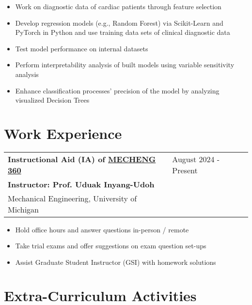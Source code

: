 \documentclass[letter,12pt]{article}
\begin{document}
\begin{itemize}[
    rightmargin=2cm
]
    \setlength{\itemsep}{1pt}
    \setlength{\parskip}{0pt}
    \setlength{\parsep}{0pt}
    \item{\small Work on diagnostic data of cardiac patients through feature selection}
    \item{\small Develop regression models (e.g., Random Forest) via Scikit-Learn and PyTorch in Python and use training data sets of clinical diagnostic data}
    \item{\small Test model performance on internal datasets}
    \item{\small Perform interpretability analysis of built models using variable sensitivity analysis}
    \item{\small Enhance classification processes' precision of the model by analyzing visualized Decision Trees}
\end{itemize}


\section{Work Experience}

\begin{tabularx}{\linewidth}{@{}l X@{}}
\large \textbf{Instructional Aid (IA) of \href{https://me.engin.umich.edu/wp-content/uploads/2023/07/ME-360-Course-Profile.pdf}{MECHENG 360}} & \hfill {August 2024 - Present} \\
\small \textbf{Instructor: Prof. Uduak Inyang-Udoh} & \hfill \small{} \\
\normalsize{Mechanical Engineering, University of Michigan} & \hfill \small{} \\
\end{tabularx}

\begin{itemize}[
    rightmargin=2cm
]
    \setlength{\itemsep}{1pt}
    \setlength{\parskip}{0pt}
    \setlength{\parsep}{0pt}
    \item{\small Hold office hours and answer questions in-person / remote}
    \item{\small Take trial exams and offer suggestions on exam question set-ups}
    \item{\small Assist Graduate Student Instructor (GSI) with homework solutions}

\end{itemize}
        

\section{Extra-Curriculum Activities}
\end{document}
